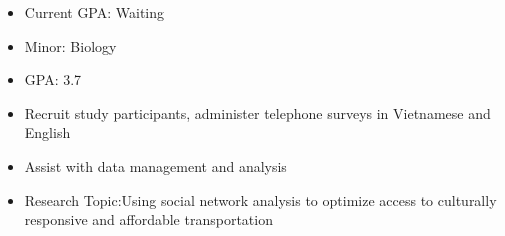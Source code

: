 \documentclass[10pt,a4paper,ragged2e]{maltacv}
\begin{document}


\makecvheader


\medskip
\begin{multicols}{2}

  \begin{itemize}
      \item Current GPA: Waiting
  \end{itemize}

  \vfill\null
  \columnbreak

  \begin{itemize}
      \item Minor: Biology
      \item GPA: 3.7
  \end{itemize}
\end{multicols}

\medskip
{}

\begin{itemize}
  \item Recruit study participants, administer telephone surveys in Vietnamese and English
  \item	Assist with data management and analysis
  \item Research Topic:Using social network analysis to optimize access to culturally responsive and affordable transportation 
\end{itemize}

\divider
\end{document}
